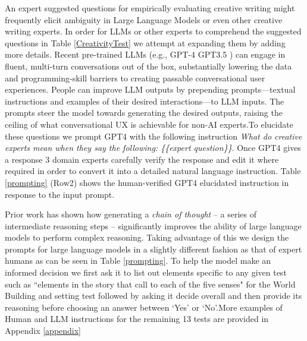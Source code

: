 An expert suggested questions for empirically evaluating creative writing might frequently elicit ambiguity in Large Language Models or even other creative writing experts. In order for LLMs or other experts to comprehend the suggested questions in Table \ref{CreativityTest} we attempt at expanding them by adding more details. Recent pre-trained LLMs (e.g., GPT-4 \cite{OpenAI2023GPT4TR} GPT3.5 \cite{ChatGPT}) can engage in fluent, multi-turn conversations out of the box, substantially lowering the data and programming-skill barriers to creating passable conversational user experiences. People can improve LLM outputs by prepending prompts—textual instructions and examples of their desired interactions—to LLM inputs. The prompts steer the model towards generating the desired outputs, raising the ceiling of what conversational UX is achievable for non-AI experts.To elucidate these questions we prompt GPT4 with the following instruction \textit{What do creative experts mean when they say the following: \{\{expert question\}\}}. Once GPT4 gives a response 3 domain experts carefully verify the response and edit it where required in order to convert it into a detailed natural language instruction. Table \ref{prompting} (Row2) shows the human-verified GPT4 elucidated instruction in response to the input prompt.

Prior work \cite{wei2022chain} has shown how generating a \textit{chain of thought} -- a series of intermediate reasoning steps -- significantly improves the ability of large language models to perform complex reasoning. Taking advantage of this we design the prompts for large language models in a slightly different fashion as that of expert humans as can be seen in Table \ref{prompting}. To help the model make an informed decision we first ask it to list out elements specific to any given test such as ``elements in the story that call to each of the five senses" for the World Building and setting test followed by asking it decide overall and then provide its reasoning before choosing an answer between `Yes' or `No'.More examples of Human and LLM instructions for the remaining 13 tests are provided in Appendix \ref{appendix}